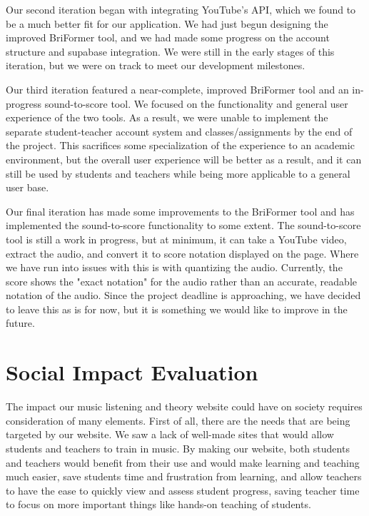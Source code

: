\documentclass[12pt, letterpaper]{article}
\begin{document}
Our second iteration began with integrating YouTube's API, which we found to be a much better fit for our application.  We had just begun designing the improved BriFormer tool, and we had made some progress on the account structure and supabase integration.  We were still in the early stages of this iteration, but we were on track to meet our development milestones.

Our third iteration featured a near-complete, improved BriFormer tool and an in-progress sound-to-score tool. We focused on the functionality and general user experience of the two tools. As a result, we were unable to implement the separate student-teacher account system and classes/assignments by the end of the project. This sacrifices some specialization of the experience to an academic environment, but the overall user experience will be better as a result, and it can still be used by students and teachers while being more applicable to a general user base.

Our final iteration has made some improvements to the BriFormer tool and has implemented the sound-to-score functionality to some extent.  The sound-to-score tool is still a work in progress, but at minimum, it can take a YouTube video, extract the audio, and convert it to score notation displayed on the page.  Where we have run into issues with this is with quantizing the audio.  Currently, the score shows the "exact notation" for the audio rather than an accurate, readable notation of the audio.  Since the project deadline is approaching, we have decided to leave this as is for now, but it is something we would like to improve in the future.

\section*{Social Impact Evaluation}
The impact our music listening and theory website could have on society requires consideration of many elements. First of all, there are the needs that are being targeted by our website. We saw a lack of well-made sites that would allow students and teachers to train in music. By making our website, both students and teachers would benefit from their use and would make learning and teaching much easier, save students time and frustration from learning, and allow teachers to have the ease to quickly view and assess student progress, saving teacher time to focus on more important things like hands-on teaching of students.
\end{document}
